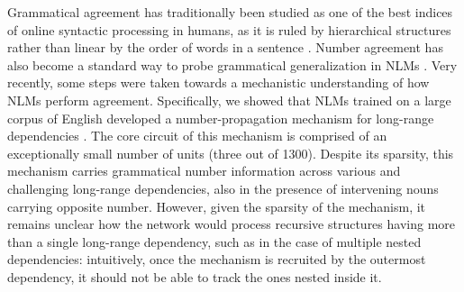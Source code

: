 Grammatical agreement has traditionally been studied as one of the
best indices of online syntactic processing in humans, as it is ruled
by hierarchical structures rather than linear by the order of words in
a sentence \citep{Bock:Miller:1991, franck2002subject}. Number
agreement has also become a standard way to probe grammatical
generalization in NLMs
\citep{Linzen:etal:2016,Bernardy:Lappin:2017,Giulianelli:etal:2018,Gulordava:etal:2018}. Very
recently, some steps were taken towards a mechanistic understanding of
how NLMs perform agreement. Specifically, we showed that NLMs trained
on a large corpus of English developed a number-propagation mechanism
for long-range dependencies \citep{lakretz2019emergence}. The core
circuit of this mechanism is comprised of an exceptionally small
number of units (three out of 1300). Despite its sparsity, this
mechanism carries grammatical number information across various and
challenging long-range dependencies, also in the presence of
intervening nouns carrying opposite number. However, given the
sparsity of the mechanism, it remains unclear how the network would
process recursive structures having more than a single long-range
dependency, such as in the case of multiple nested dependencies:
intuitively, once the mechanism is recruited by the outermost
dependency, it should not be able to track the ones nested inside it.




